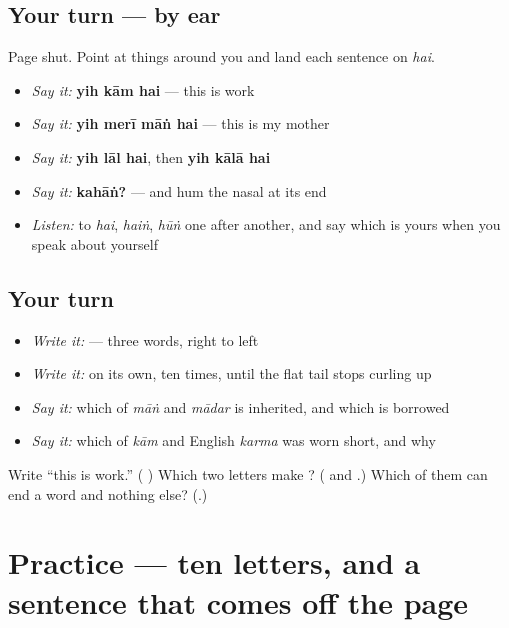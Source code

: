 \subsection*{Your turn — by ear}
Page shut. Point at things around you and land each sentence on \emph{hai}.

\begin{itemize}
\raggedright
  \item \emph{Say it:} \textbf{yih kām hai} — this is work
  \item \emph{Say it:} \textbf{yih merī māṅ hai} — this is my mother
  \item \emph{Say it:} \textbf{yih lāl hai}, then \textbf{yih kālā hai}
  \item \emph{Say it:} \textbf{kahāṅ?} — and hum the nasal at its end
  \item \emph{Listen:} to \emph{hai}, \emph{haiṅ}, \emph{hūṅ} one after another, and say which is yours when you speak about yourself
\end{itemize}

\subsection*{Your turn}
\begin{itemize}
\raggedright
  \item \emph{Write it:}    — three words, right to left
  \item \emph{Write it:}  on its own, ten times, until the flat tail stops curling up
  \item \emph{Say it:} which of \emph{māṅ} and \emph{mādar} is inherited, and which is borrowed
  \item \emph{Say it:} which of \emph{kām} and English \emph{karma} was worn short, and why
\end{itemize}

\begin{tcolorbox}[breakable,colback=teal!4,colframe=teal!35!black,title={Before you move on}]
Write \textquotedblleft{}this is work.\textquotedblright{} (\textbf{  }) Which two letters make \textbf{}? (\textbf{} and \textbf{}.) Which of them can end a word and nothing else? (\textbf{}.)
\end{tcolorbox}
\section[Practice]{Practice — ten letters, and a sentence that comes off the page}

